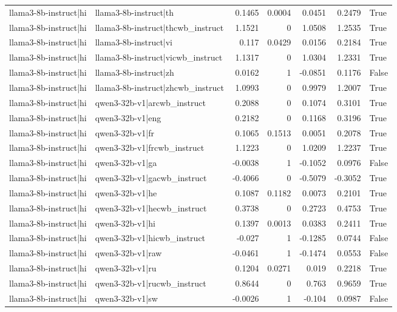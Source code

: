 \begin{table}
\begin{tabular}{l l r r r r l}
llama3-8b-instruct|hi & llama3-8b-instruct|th & 0.1465 & 0.0004 & 0.0451 & 0.2479 & True \\
llama3-8b-instruct|hi & llama3-8b-instruct|thcwb_instruct & 1.1521 & 0 & 1.0508 & 1.2535 & True \\
llama3-8b-instruct|hi & llama3-8b-instruct|vi & 0.117 & 0.0429 & 0.0156 & 0.2184 & True \\
llama3-8b-instruct|hi & llama3-8b-instruct|vicwb_instruct & 1.1317 & 0 & 1.0304 & 1.2331 & True \\
llama3-8b-instruct|hi & llama3-8b-instruct|zh & 0.0162 & 1 & -0.0851 & 0.1176 & False \\
llama3-8b-instruct|hi & llama3-8b-instruct|zhcwb_instruct & 1.0993 & 0 & 0.9979 & 1.2007 & True \\
llama3-8b-instruct|hi & qwen3-32b-v1|arcwb_instruct & 0.2088 & 0 & 0.1074 & 0.3101 & True \\
llama3-8b-instruct|hi & qwen3-32b-v1|eng & 0.2182 & 0 & 0.1168 & 0.3196 & True \\
llama3-8b-instruct|hi & qwen3-32b-v1|fr & 0.1065 & 0.1513 & 0.0051 & 0.2078 & True \\
llama3-8b-instruct|hi & qwen3-32b-v1|frcwb_instruct & 1.1223 & 0 & 1.0209 & 1.2237 & True \\
llama3-8b-instruct|hi & qwen3-32b-v1|ga & -0.0038 & 1 & -0.1052 & 0.0976 & False \\
llama3-8b-instruct|hi & qwen3-32b-v1|gacwb_instruct & -0.4066 & 0 & -0.5079 & -0.3052 & True \\
llama3-8b-instruct|hi & qwen3-32b-v1|he & 0.1087 & 0.1182 & 0.0073 & 0.2101 & True \\
llama3-8b-instruct|hi & qwen3-32b-v1|hecwb_instruct & 0.3738 & 0 & 0.2723 & 0.4753 & True \\
llama3-8b-instruct|hi & qwen3-32b-v1|hi & 0.1397 & 0.0013 & 0.0383 & 0.2411 & True \\
llama3-8b-instruct|hi & qwen3-32b-v1|hicwb_instruct & -0.027 & 1 & -0.1285 & 0.0744 & False \\
llama3-8b-instruct|hi & qwen3-32b-v1|raw & -0.0461 & 1 & -0.1474 & 0.0553 & False \\
llama3-8b-instruct|hi & qwen3-32b-v1|ru & 0.1204 & 0.0271 & 0.019 & 0.2218 & True \\
llama3-8b-instruct|hi & qwen3-32b-v1|rucwb_instruct & 0.8644 & 0 & 0.763 & 0.9659 & True \\
llama3-8b-instruct|hi & qwen3-32b-v1|sw & -0.0026 & 1 & -0.104 & 0.0987 & False \\

\end{tabular}
\end{table}
